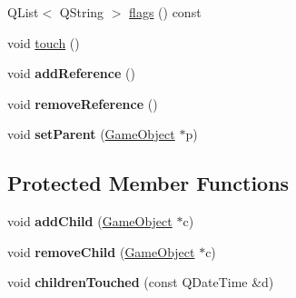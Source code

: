 \begin{DoxyCompactItemize}
Q\+List$<$ Q\+String $>$ \hyperlink{class_game_object_ad6f21f7458be4192a920013dbb3e590e}{flags} () const
\item 
void \hyperlink{class_game_object_a2130d5674df041b5a7eaf987f9b1e642}{touch} ()
\item 
\hypertarget{class_game_object_a815c7f587c0ae528614add95655d9a0a}{}\label{class_game_object_a815c7f587c0ae528614add95655d9a0a} 
void {\bfseries add\+Reference} ()
\item 
\hypertarget{class_game_object_a68725fd75f55bc73bb44216406ce34e5}{}\label{class_game_object_a68725fd75f55bc73bb44216406ce34e5} 
void {\bfseries remove\+Reference} ()
\item 
\hypertarget{class_game_object_ae34944b23d5d7d472d5c8da3f42fb2e3}{}\label{class_game_object_ae34944b23d5d7d472d5c8da3f42fb2e3} 
void {\bfseries set\+Parent} (\hyperlink{class_game_object}{Game\+Object} $\ast$p)
\end{DoxyCompactItemize}
\subsection*{Protected Member Functions}
\begin{DoxyCompactItemize}
\item 
\hypertarget{class_game_object_a4733a1081db3c2d0a9be225265283ad8}{}\label{class_game_object_a4733a1081db3c2d0a9be225265283ad8} 
void {\bfseries add\+Child} (\hyperlink{class_game_object}{Game\+Object} $\ast$c)
\item 
\hypertarget{class_game_object_a21dc679cb474b147b7d7d336117ffe58}{}\label{class_game_object_a21dc679cb474b147b7d7d336117ffe58} 
void {\bfseries remove\+Child} (\hyperlink{class_game_object}{Game\+Object} $\ast$c)
\item 
\hypertarget{class_game_object_a4e57d5a3f8be6882e5d7f2a2e5d45ccd}{}\label{class_game_object_a4e57d5a3f8be6882e5d7f2a2e5d45ccd} 
void {\bfseries children\+Touched} (const Q\+Date\+Time \&d)
\end{DoxyCompactItemize}
